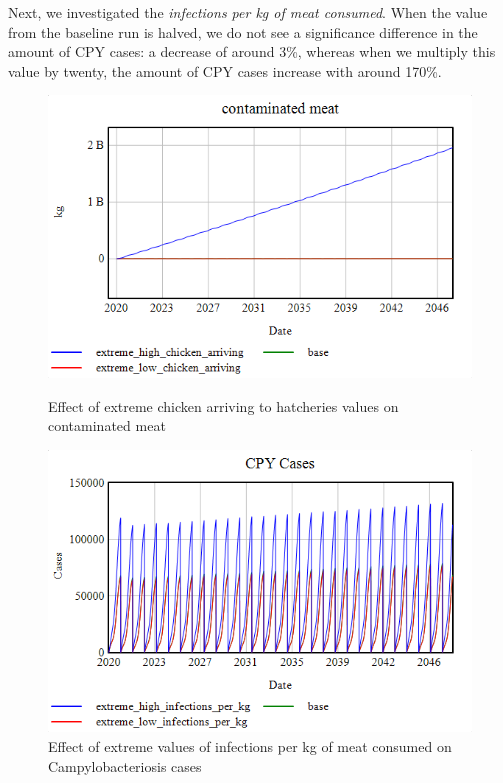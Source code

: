 Next, we investigated the \textit{infections per kg of meat consumed}. When the value from the baseline run is halved, we do not see a significance difference in the amount of CPY cases: a decrease of around 3\%, whereas when we multiply this value by twenty, the amount of CPY cases increase with around 170\%.

\begin{figure}[h!]
    \centering
    \begin{minipage}{0.45\textwidth}
        \centering
        \includegraphics[width=\textwidth]{images/extremes/Chicken_arriving_contaminated_meat.png} 
        \caption{Effect of extreme chicken arriving to hatcheries values on contaminated meat}
        \label{fig:chicken_meat}
    \end{minipage}
    \begin{minipage}{0.45\textwidth}
        \centering
        \includegraphics[width=\textwidth]{images/extremes/Infections_per_kg_CPY_cases.png} 
        \caption{Effect of extreme values of infections per kg of meat consumed on Campylobacteriosis cases}
        \label{fig:infections_cases}
    \end{minipage}
\end{figure}

